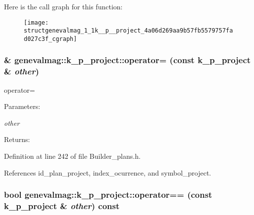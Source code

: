 Here is the call graph for this function:\nopagebreak
\begin{figure}[H]
\begin{center}
\leavevmode
\texttt{[image: structgenevalmag\_1\_1k\_\_p\_\_project\_4a06d269aa9b57fb5579757fad027c3f\_cgraph]}
\end{center}
\end{figure}
\hypertarget{structgenevalmag_1_1k__p__project_e64d4643b5a6e52389a540b5725dc148}{
\subsubsection[{operator=}]{\& genevalmag::k\_\-p\_\-project::operator= (const {\bf k\_\-p\_\-project} \& {\em other})}}
\label{structgenevalmag_1_1k__p__project_e64d4643b5a6e52389a540b5725dc148}


operator= \begin{Desc}
\item[Parameters:]
\begin{description}
\item[{\em other}]\end{description}
\end{Desc}
\begin{Desc}
\item[Returns:]\end{Desc}


Definition at line 242 of file Builder\_\-plans.h.

References id\_\-plan\_\-project, index\_\-ocurrence, and symbol\_\-project.\hypertarget{structgenevalmag_1_1k__p__project_277ca3092cf5e354a88ee0d63ac4bc25}{
\subsubsection[{operator==}]{\setlength{\rightskip}{0pt plus 5cm}bool genevalmag::k\_\-p\_\-project::operator== (const {\bf k\_\-p\_\-project} \& {\em other}) const}}
\label{structgenevalmag_1_1k__p__project_277ca3092cf5e354a88ee0d63ac4bc25}


